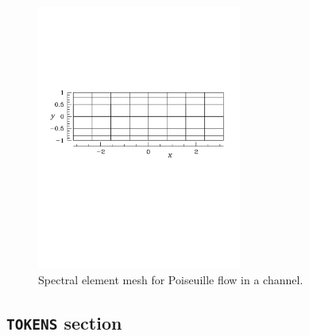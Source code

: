 \documentclass[11pt,a4paper]{report}
\begin{document}
\begin{figure}
\begin{center}
\includegraphics[width=0.6\textwidth]{channel_mesh}
\end{center}
\caption{Spectral element mesh for Poiseuille flow in a channel.}
\label{fig.chanmesh}
\end{figure}

\subsection{\texttt{TOKENS} section}
\end{document}
